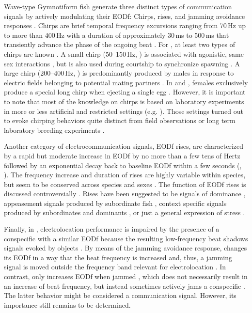 Wave-type Gymnotiform fish generate three distinct types of communication signals by actively modulating their EODf: Chirps, rises, and jamming avoidance responses \citep{Engler2000, Zakon2002}. Chirps are brief temporal frequency excursions ranging from 70\,Hz up to more than 400\,Hz with a duration of approximately 30\,ms to 500\,ms \citep{Engler2000} that transiently advance the phase of the ongoing beat \citep{Benda2005}. For \aptero{}, at least two types of chirps are known \citep{Hagedorn1985, Dunlap2003b, Henninger2018}. A small chirp (50--150\,Hz, ) is associated with agonistic, same sex interactions \citep{Smith2013}, but is also used during courtship to synchronize spawning \citep{Henninger2018}. A large chirp (200--400\,Hz, ) is predominantly produced by males in response to electric fields belonging to potential mating partners \citep{Triefenbach2003}. In \rostratus{} and \lepto{}, females exclusively produce a special long chirp when ejecting a single egg \citep{Hagedorn1985, Henninger2018}. However, it is important to note that most of the knowledge on chirps is based on laboratory experiments in more or less artificial and restricted settings (e.g. \citealp{Engler2001, Dunlap2003b, Zupanc2006, Hupe2008}). Those settings turned out to evoke chirping behaviors quite distinct from field observations or long term laboratory breeding experiments \citep{Henninger2018}. 

Another category of electrocommunication signals, EODf rises, are characterized by a rapid but moderate increase in EODf by no more than a few tens of Hertz followed by an exponential decay back to baseline EODf within a few seconds (\citealp{Hagedorn1985, Engler2000, Zakon2002}, ). The frequency increase and duration of rises are highly variable within species, but seem to be conserved across species and sexes \citep{Turner2007}. The function of EODf rises is discussed controversially \citep{Smith2013}. Rises have been suggested to be signals of dominance \citep{Tallarovic2005}, appeasement signals produced by subordinate fish \citep{Serrano2003}, context specific signals produced by subordinates and dominants \citep{Hopkins1974}, or just a general expression of stress \citep{Smith2013}.

Finally, in \Eigenmannia{}, electrolocation performance is impaired by the presence of a conspecific with a similar EODf \citep{Heiligenberg1973} because the resulting low-frequency beat shadows signals evoked by objects \citep{Behrend1977}. By means of the jamming avoidance response, \Eigenmannia{} changes its EODf in a way that the beat frequency is increased \citep{Watanabe1963, Bullock1969} and, thus, a jamming signal is moved outside the frequency band relevant for electrolocation \citep{Nelson1999, Fotowat2013}. In contrast, \aptero{} only increases EODf when jammed \citep{Heiligenberg1996}, which does not necessarily result in an increase of beat frequency, but instead sometimes actively jams a conspecific \citep{Tallarovic2005, Triefenbach2008}. The latter behavior might be considered a communication signal. However, its importance still remains to be determined.


